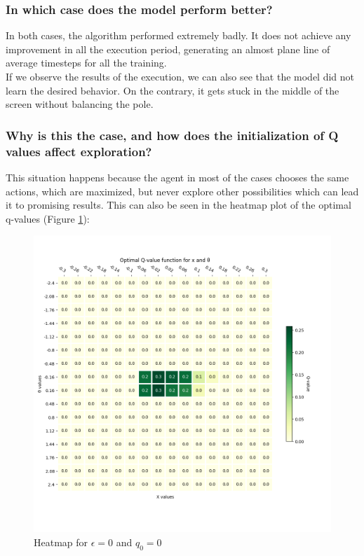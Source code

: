 \documentclass[12pt]{article}
\begin{document}
\subsubsection{In which case does the model perform better?}

In both cases, the algorithm performed extremely badly. It does not achieve any improvement in all the execution period, generating an almost plane line of average timesteps for all the training. \\

If we observe the results of the execution, we can also see that the model did not learn the desired behavior. On the contrary, it gets stuck in the middle of the screen without balancing the pole.

\subsubsection{Why is this the case, and how does the initialization of Q values
affect exploration?}

This situation happens because the agent in most of the cases chooses the same actions, which are maximized, but never explore other possibilities which can lead it to promising results. This can also be seen in the heatmap plot of the optimal q-values (Figure \ref{fig:q2-2}):

\begin{figure}[h]
    \centering
    \includegraphics[scale=0.25]{exercise-3/plots/heatmap-fixed-0.0.png}
    \caption{Heatmap for $\epsilon=0$ and $q_0 = 0$}
    \label{fig:q2-2}
\end{figure}
\end{document}

